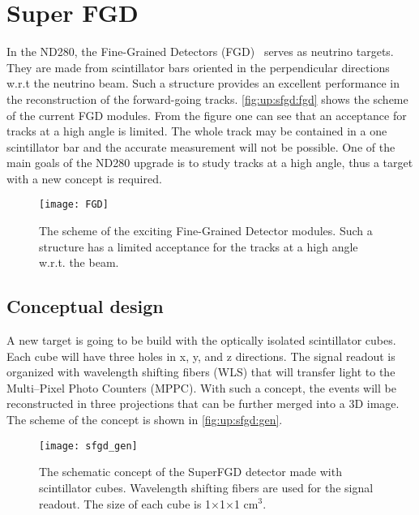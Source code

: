 \documentclass[main.tex]{subfiles}
\begin{document}
\renewcommand{\labelitemi}{\ding{226}}
\renewcommand{\labelitemii}{\ding{227}}

\newcommand{\sfgdx}{192}
\newcommand{\sfgdy}{184}
\newcommand{\sfgdz}{56}

\chapter{Super FGD}
\label{ch:up:sfgd}
In the ND280, the Fine-Grained Detectors (FGD)~\cite{Amaudruz2012} serves as neutrino targets. They are made from scintillator bars oriented in the perpendicular directions w.r.t the neutrino beam. Such a structure provides an excellent performance in the reconstruction of the forward-going tracks. \autoref{fig:up:sfgd:fgd} shows the scheme of the current FGD modules. From the figure one can see that an acceptance for tracks at a high angle is limited. The whole track may be contained in a one scintillator bar and the accurate measurement will not be possible. One of the main goals of the ND280 upgrade is to study tracks at a high angle, thus a target with a new concept is required.

\begin{figure}[!ht]
	\centering
	\texttt{[image: FGD]}
	\caption{The scheme of the exciting Fine-Grained Detector modules. Such a structure has a limited acceptance for the tracks at a high angle w.r.t. the beam.}
	\label{fig:up:sfgd:fgd}
\end{figure}

\section{Conceptual design}
A new target is going to be build with the optically isolated scintillator cubes. Each cube will have three holes in x, y, and z directions. The signal readout is organized with wavelength shifting fibers (WLS) that will transfer light to the Multi--Pixel Photo Counters (MPPC). With such a concept, the events will be reconstructed in three projections that can be further merged into a 3D image. The scheme of the concept is shown in \autoref{fig:up:sfgd:gen}.

\begin{figure}[!ht]
	\centering
	\texttt{[image: sfgd\_gen]}
	\caption{The schematic concept of the SuperFGD detector made with scintillator cubes. Wavelength shifting fibers are used for the signal readout. The size of each cube is 1$\times$1$\times$1 $\text{cm}^3$.}
	\label{fig:up:sfgd:gen}
\end{figure}
\end{document}
